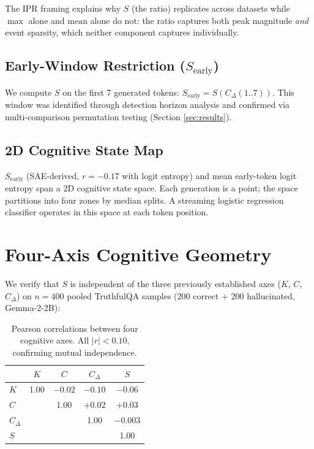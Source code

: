\documentclass{article}
\begin{document}
The IPR framing explains why $S$ (the ratio) replicates across datasets
while $\max$ alone and $\text{mean}$ alone do not: the ratio captures
both peak magnitude \textit{and} event sparsity, which neither component
captures individually.

\subsection{Early-Window Restriction ($S_\text{early}$)}

We compute $S$ on the first 7 generated tokens: $S_\text{early} =
S(C_\Delta(1..7))$. This window was identified through detection horizon
analysis and confirmed via multi-comparison permutation testing (Section
\ref{sec:results}).

\subsection{2D Cognitive State Map}

$S_\text{early}$ (SAE-derived, $r = -0.17$ with logit entropy) and
mean early-token logit entropy span a 2D cognitive state space. Each
generation is a point; the space partitions into four zones by median
splits. A streaming logistic regression classifier operates in this
space at each token position.

\section{Four-Axis Cognitive Geometry}

We verify that $S$ is independent of the three previously established
axes ($K$, $C$, $C_\Delta$) on $n = 400$ pooled TruthfulQA samples
(200 correct $+$ 200 hallucinated, Gemma-2-2B):

\begin{table}[h]
\centering
\small
\begin{tabular}{lcccc}
\toprule
 & $K$ & $C$ & $C_\Delta$ & $S$ \\
\midrule
$K$ & 1.00 & $-0.02$ & $-0.10$ & $-0.06$ \\
$C$ &      & 1.00    & $+0.02$ & $+0.03$ \\
$C_\Delta$ & & & 1.00 & $-0.003$ \\
$S$ & & & & 1.00 \\
\bottomrule
\end{tabular}
\caption{Pearson correlations between four cognitive axes. All
$|r| < 0.10$, confirming mutual independence.}
\label{tab:orthogonality}
\end{table}
\end{document}
